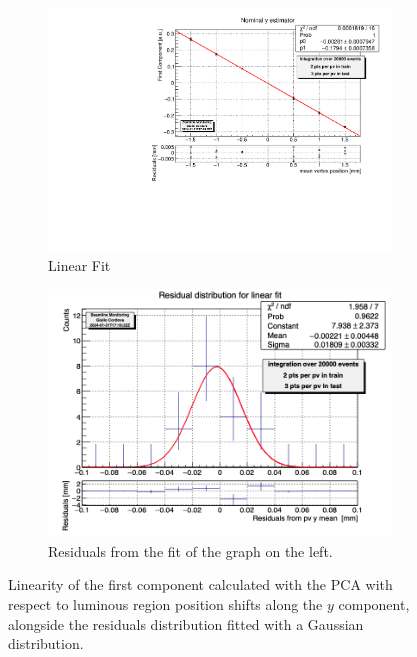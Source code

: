 \begin{figure}
    \centering
    \begin{subfigure}{0.48\textwidth}
    \includegraphics[width=\linewidth]{figures/y_fit_MC.pdf}
    \caption{Linear Fit}\label{fig:yfit_MC}
    \end{subfigure}
    \begin{subfigure}{0.48\textwidth}
    \includegraphics[width=\linewidth]{figures/y_res_MC.png}
    \caption{Residuals from the fit of the graph on the left. }\label{fig:yres_MC}
    \end{subfigure}
    \caption{Linearity of the first component calculated with the PCA with respect to luminous region position shifts along the $y$ component, alongside the residuals distribution fitted with a Gaussian distribution.}
    \label{fig:y_MC}
\end{figure}


